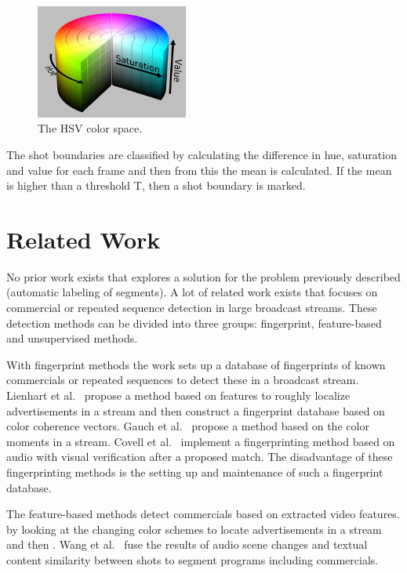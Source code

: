 \documentclass{article}
\begin{document}
\begin{figure}[H]
	\includegraphics[width=5cm]{images/hsv.png}
	\centering
	\caption{The HSV color space.}
	\label{hsvspace}
\end{figure}

The shot boundaries are classified by calculating the difference in hue, saturation and value for each frame and then from this the mean is calculated. If the mean is higher than a threshold T, then a shot boundary is marked.

\section{Related Work} \label{relatedwork}

No prior work exists that explores a solution for the problem previously described (automatic labeling of segments).  A lot of related work exists that focuses on commercial or repeated sequence detection in large broadcast streams. These detection methods can be divided into three groups: fingerprint, feature-based and unsupervised methods. 

With fingerprint methods the work sets up a database of fingerprints of known commercials or repeated sequences to detect these in a broadcast stream. Lienhart et al.\ \cite{lienhart1997detection} propose a method based on features to roughly localize advertisements in a stream and then construct a fingerprint database based on color coherence vectors. Gauch et al.\ \cite{gauch2006finding} propose a method based on the color moments in a stream. Covell et al.\ \cite{covell2006advertisement} implement a fingerprinting method based on audio with visual verification after a proposed match. The disadvantage of these fingerprinting methods is the setting up and maintenance of such a fingerprint database. 


The feature-based methods detect commercials based on extracted video features.  by looking at the changing color schemes to locate advertisements in a stream and then . Wang et al.\ \cite{wang2008multimodal} fuse the results of audio scene changes and textual content similarity between shots to segment programs including commercials.
\end{document}
